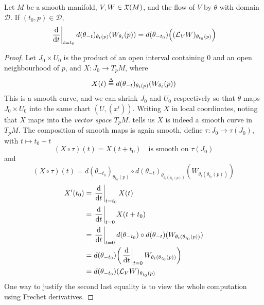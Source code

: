 \documentclass[../main-manifolds.tex]{subfiles}
\begin{document}
\begin{wts}\label{lee-chp9:prop-9.41}
    Let $M$ be a smooth manifold, $V,W\in\mathfrak{X}(M)$, and the flow of $V$ by $\theta$ with domain $\mathcal{D}$. If $(t_0, p)\in \mathcal{D}$,
    \[
        \eval{\dv{t}}_{t=t_0} d(\theta_{-t})_{\theta_t(p)}(W_{\theta_t}(p)) = d(\theta_{-t_0})\qty((\mathcal{L}_V W)_{\theta_{t_0}(p)})
    \]
\end{wts}
\begin{proof}
    Let $J_0\times U_0$ is the product of an open interval containing $0$ and an open neighbourhood of $p$, and $X: J_0\to T_pM$, where
    \[
        X(t)\overset{\Delta}{=} d(\theta_{-t})_{\theta_t(p)}(W_{\theta_t}(p))
    \]
    This is a smooth curve, and we can shrink $J_0$ and $U_0$ respectively so that $\theta$ maps $J_0\times U_0$ into the same chart $(U, (x^i))$. Writing $X$ in local coordinates, noting that $X$ maps into the \emph{vector space $T_pM$}.  tells us $X$ is indeed a smooth curve in $T_pM$. The composition of smooth maps is again smooth, define $\tau: J_0\to \tau(J_0)$, with $t\mapsto t_0 + t$
    \[
        (X\circ \tau)(t) = X(t+t_0)\quad\text{is smooth on }\tau(J_0)
    \]
    and
    \[
        (X\circ \tau)(t) = d(\theta_{-t_0})_{\theta_{t_0}(p)}\circ d(\theta_{-t})_{\theta_{\theta_{t}(\theta_{t_0}(p))}}(W_{\theta_{t}(\theta_{t_0}(p))})
    \]
    \begin{align*}
        X'(t_0) &=\eval{\dv{t}}_{t=t_0} X(t)\\
        &= \eval{\dv{t}}_{t=0} X(t + t_0)\\
        &= \eval{\dv{t}}_{t=0} d(\theta_{-t_0})\circ d(\theta_{-t})(W_{\theta_{t}(\theta_{t_0}(p))})\\
        &= d(\theta_{-t_0})\qty(\eval{\dv{t}}_{t=0} W_{\theta_t(\theta_{t_0}(p))} )\\
        &= d(\theta_{-t_0})(\mathcal{L}_VW)_{\theta_{t_0}(p)}
    \end{align*}
    One way to justify the second last equality is to view the whole computation using Frechet derivatives.
\end{proof}
\end{document}
